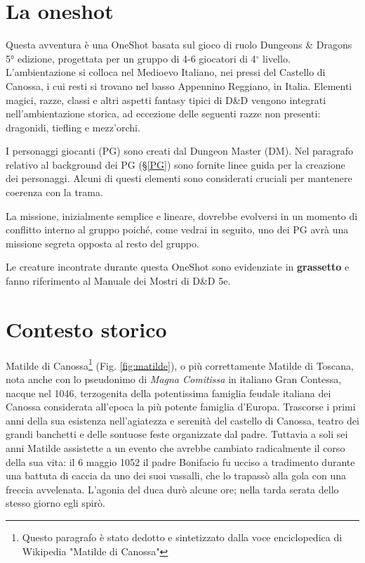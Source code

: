 \documentclass[letterpaper,twocolumn,openany,nodeprecatedcode]{dndbook}
\begin{document}
\section{La oneshot}
Questa avventura è una OneShot basata sul gioco di ruolo Dungeons \& Dragons 5° edizione\cite{dnd:giocatore}, progettata per un gruppo di 4-6 giocatori di 4$^\circ$ livello. L'ambientazione si colloca nel Medioevo Italiano, nei pressi del Castello di Canossa, i cui resti si trovano nel basso Appennino Reggiano, in Italia. Elementi magici, razze, classi e altri aspetti fantasy tipici di D\&D vengono integrati nell'ambientazione storica, ad eccezione delle seguenti razze non presenti: dragonidi, tiefling e mezz'orchi.

I personaggi giocanti (PG) sono creati dal Dungeon Master (DM). Nel paragrafo relativo al background dei PG (§\ref{PG}) sono fornite linee guida per la creazione dei personaggi. Alcuni di questi elementi sono considerati cruciali per mantenere coerenza con la trama.

La missione, inizialmente semplice e lineare, dovrebbe evolversi in un momento di conflitto interno al gruppo poiché, come vedrai in seguito, uno dei PG avrà una missione segreta opposta al resto del gruppo.

Le creature incontrate durante questa OneShot sono evidenziate in \textbf{grassetto} e fanno riferimento al Manuale dei Mostri di D\&D 5e\cite{dnd:mostri}.



\section{Contesto storico}

Matilde di Canossa\footnote{Questo paragrafo è stato dedotto e sintetizzato dalla voce enciclopedica di Wikipedia "Matilde di Canossa"} (Fig. \ref{fig:matilde})\cite{wiki:matilde}, o più correttamente Matilde di Toscana, nota anche con lo pseudonimo di \textit{Magna Comitissa} in italiano Gran Contessa, nacque nel 1046, terzogenita della potentissima famiglia feudale italiana dei Canossa considerata all'epoca la più potente famiglia d'Europa. Trascorse i primi anni della sua esistenza nell'agiatezza e serenità del castello di Canossa, teatro dei grandi banchetti e delle sontuose feste organizzate dal padre. Tuttavia a soli sei anni Matilde assistette a un evento che avrebbe cambiato radicalmente il corso della sua vita: il 6 maggio 1052 il padre Bonifacio fu ucciso a tradimento durante una battuta di caccia da uno dei suoi vassalli, che lo trapassò alla gola con una freccia avvelenata. L'agonia del duca durò alcune ore; nella tarda serata dello stesso giorno egli spirò.
\end{document}
